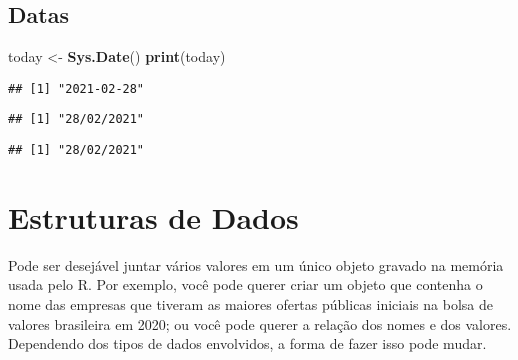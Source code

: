 \documentclass[
]{book}
\newenvironment{Shaded}{\begin{snugshade}}{\end{snugshade}}
\newcommand{\KeywordTok}[1]{\textcolor[rgb]{0.13,0.29,0.53}{\textbf{#1}}}
\newcommand{\NormalTok}[1]{#1}
\newcommand{\StringTok}[1]{\textcolor[rgb]{0.31,0.60,0.02}{#1}}
\begin{document}
\hypertarget{datas}{%
\section{Datas}\label{datas}}

\begin{Shaded}
\begin{Highlighting}[]
\NormalTok{today <-}\StringTok{ }\KeywordTok{Sys.Date}\NormalTok{()}
\KeywordTok{print}\NormalTok{(today)}
\end{Highlighting}
\end{Shaded}

\begin{verbatim}
## [1] "2021-02-28"
\end{verbatim}

\begin{Shaded}
\end{Shaded}

\begin{verbatim}
## [1] "28/02/2021"
\end{verbatim}

\begin{Shaded}
\end{Shaded}

\begin{verbatim}
## [1] "28/02/2021"
\end{verbatim}

\hypertarget{estruturas-de-dados}{%
\chapter{Estruturas de Dados}\label{estruturas-de-dados}}

Pode ser desejável juntar vários valores em um único objeto gravado na memória usada pelo R. Por exemplo, você pode querer criar um objeto que contenha o nome das empresas que tiveram as maiores ofertas públicas iniciais na bolsa de valores brasileira em 2020; ou você pode querer a relação dos nomes e dos valores. Dependendo dos tipos de dados envolvidos, a forma de fazer isso pode mudar.
\end{document}
